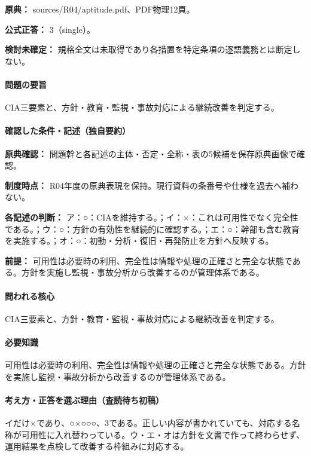 \noindent\textbf{原典：} sources/R04/aptitude.pdf、PDF物理12頁。

\textbf{公式正答：} 3（single）。

\par\textbf{検討未確定：} 規格全文は未取得であり各措置を特定条項の逐語義務とは断定しない。

\paragraph{問題の要旨} CIA三要素と、方針・教育・監視・事故対応による継続改善を判定する。

\paragraph{確認した条件・記述（独自要約）}\mbox{}\par

\noindent\textbf{原典確認：} 問題幹と各記述の主体・否定・全称・表の5候補を保存原典画像で確認。\par

\noindent\textbf{制度時点：} R04年度の原典表現を保持。現行資料の条番号や仕様を過去へ補わない。\par

\noindent\textbf{各記述の判断：} ア：○：CIAを維持する。；イ：×：これは可用性でなく完全性である。；ウ：○：方針の有効性を継続的に確認する。；エ：○：幹部も含む教育を実施する。；オ：○：初動・分析・復旧・再発防止を方針へ反映する。\par

\noindent\textbf{前提：} 可用性は必要時の利用、完全性は情報や処理の正確さと完全な状態である。方針を実施し監視・事故分析から改善するのが管理体系である。\par

\paragraph{問われる核心} CIA三要素と、方針・教育・監視・事故対応による継続改善を判定する。

\paragraph{必要知識} 可用性は必要時の利用、完全性は情報や処理の正確さと完全な状態である。方針を実施し監視・事故分析から改善するのが管理体系である。

\paragraph{考え方・正答を選ぶ理由（査読待ち初稿）} イだけ×であり、○×○○○、3である。正しい内容が書かれていても、対応する名称が可用性に入れ替わっている。ウ・エ・オは方針を文書で作って終わらせず、運用結果を点検して改善する枠組みに対応する。

